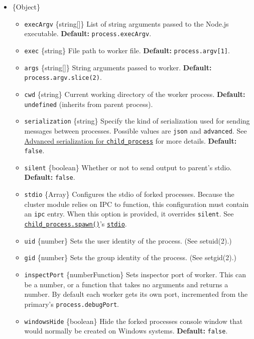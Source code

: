 \begin{itemize}
\tightlist
\item
  \{Object\}

  \begin{itemize}
  \tightlist
  \item
    \texttt{execArgv} \{string{[}{]}\} List of string arguments passed
    to the Node.js executable. \textbf{Default:}
    \texttt{process.execArgv}.
  \item
    \texttt{exec} \{string\} File path to worker file. \textbf{Default:}
    \texttt{process.argv{[}1{]}}.
  \item
    \texttt{args} \{string{[}{]}\} String arguments passed to worker.
    \textbf{Default:} \texttt{process.argv.slice(2)}.
  \item
    \texttt{cwd} \{string\} Current working directory of the worker
    process. \textbf{Default:} \texttt{undefined} (inherits from parent
    process).
  \item
    \texttt{serialization} \{string\} Specify the kind of serialization
    used for sending messages between processes. Possible values are
    \texttt{\textquotesingle{}json\textquotesingle{}} and
    \texttt{\textquotesingle{}advanced\textquotesingle{}}. See
    \href{child_process.md\#advanced-serialization}{Advanced
    serialization for \texttt{child\_process}} for more details.
    \textbf{Default:} \texttt{false}.
  \item
    \texttt{silent} \{boolean\} Whether or not to send output to
    parent's stdio. \textbf{Default:} \texttt{false}.
  \item
    \texttt{stdio} \{Array\} Configures the stdio of forked processes.
    Because the cluster module relies on IPC to function, this
    configuration must contain an
    \texttt{\textquotesingle{}ipc\textquotesingle{}} entry. When this
    option is provided, it overrides \texttt{silent}. See
    \href{child_process.md\#child_processspawncommand-args-options}{\texttt{child\_process.spawn()}}'s
    \href{child_process.md\#optionsstdio}{\texttt{stdio}}.
  \item
    \texttt{uid} \{number\} Sets the user identity of the process. (See
    setuid(2).)
  \item
    \texttt{gid} \{number\} Sets the group identity of the process. (See
    setgid(2).)
  \item
    \texttt{inspectPort} \{number\textbar Function\} Sets inspector port
    of worker. This can be a number, or a function that takes no
    arguments and returns a number. By default each worker gets its own
    port, incremented from the primary's \texttt{process.debugPort}.
  \item
    \texttt{windowsHide} \{boolean\} Hide the forked processes console
    window that would normally be created on Windows systems.
    \textbf{Default:} \texttt{false}.
  \end{itemize}
\end{itemize}

